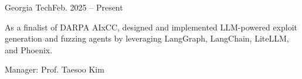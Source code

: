 

\begin{timeitemize}{Georgia Tech}{Feb. 2025 -- Present}
    \item As a finalist of DARPA AIxCC, designed and implemented LLM-powered exploit generation and fuzzing agents by leveraging LangGraph, LangChain, LiteLLM, and Phoenix.
    \item Manager: Prof. Taesoo Kim
\end{timeitemize}

